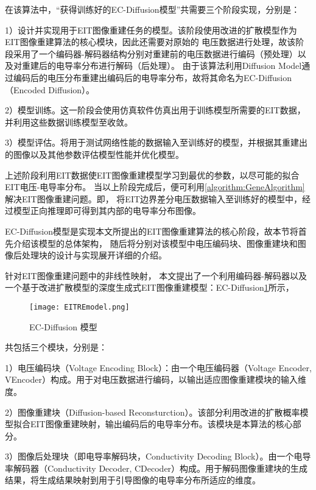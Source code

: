 在该算法中，“获得训练好的EC-Diffusion模型”共需要三个阶段实现，分别是：

1）设计并实现用于EIT图像重建任务的模型。该阶段使用改进的扩散模型作为EIT图像重建算法的核心模块，因此还需要对原始的
电压数据进行处理，故该阶段采用了一个编码器-解码器结构分别对重建前的电压数据进行编码（预处理）以及对重建后的电导率分布进行解码（后处理）。
由于该算法利用Diffusion Model通过编码后的电压分布重建出编码后的电导率分布，故将其命名为EC-Diffusion（Encoded Diffusion）。

2）模型训练。这一阶段会使用仿真软件仿真出用于训练模型所需要的EIT数据，并利用这些数据训练模型至收敛。

3）模型评估。将用于测试网络性能的数据输入至训练好的模型，并根据其重建出的图像以及其他参数评估模型性能并优化模型。

上述阶段利用EIT数据使EIT图像重建模型学习到最优的参数，以尽可能的拟合EIT电压-电导率分布。
当以上阶段完成后，便可利用\cref{algorithm:GeneAlgorithm}解决EIT图像重建问题。即，
将EIT边界差分电压数据输入至训练好的模型中，经过模型正向推理即可得到其内部的电导率分布图像。



EC-Diffusion模型是实现本文所提出的EIT图像重建算法的核心阶段，故本节将首先介绍该模型的总体架构，
随后将分别对该模型中电压编码块、图像重建块和图像后处理块的设计与实现展开详细的介绍。

\label{section:Model}

针对EIT图像重建问题中的非线性映射，
本文提出了一个利用编码器-解码器以及一个基于改进扩散模型的深度生成式EIT图像重建模型：EC-Diffusion\cref{figure:EITREmodel}所示，

\begin{figure}[h]
    \centering
    \texttt{[image: EITREmodel.png]}
    \caption{EC-Diffusion 模型}
    \label{figure:EITREmodel}
\end{figure}
共包括三个模块，分别是：

1）电压编码块（Voltage Encoding Block）：由一个电压编码器（Voltage Encoder, VEncoder）构成。用于对电压数据进行编码，以输出适应图像重建模块的输入维度。

2）图像重建块（Diffusion-based Reconsturction）。该部分利用改进的扩散概率模型拟合EIT图像重建映射，输出编码后的电导率分布。该模块是本算法的核心部分。

3）图像后处理块（即电导率解码块，Conductivity Decoding Block）。由一个电导率解码器（Conductivity Decoder, CDecoder）构成。用于解码图像重建块的生成结果，将生成结果映射到用于引导图像的电导率分布所适应的维度。

